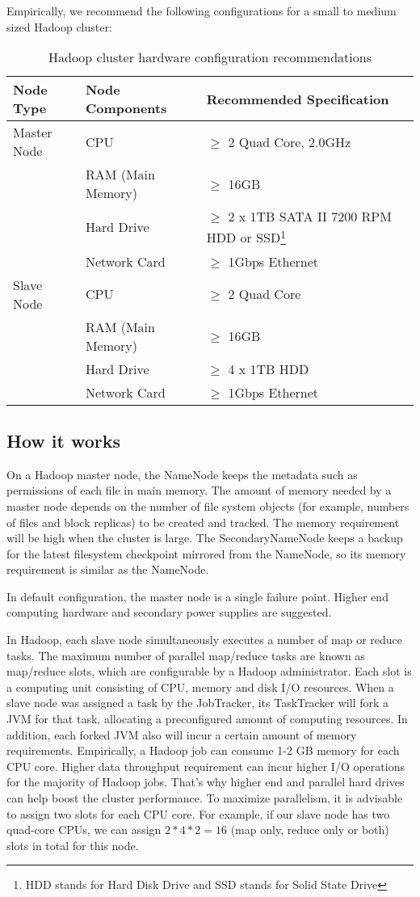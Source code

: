Empirically, we recommend the following configurations for a small to medium sized Hadoop cluster:

\begin{table}[h]
  \centering
  \begin{tabular}{lll}
    \toprule
    \textbf{Node Type} & \textbf{Node Components} & \textbf{Recommended Specification} \\ \midrule
    Master Node & CPU	& $\ge$ 2 Quad Core, 2.0GHz \\
    & RAM (Main Memory) & $\ge$ 16GB \\
    & Hard Drive & $\ge$ 2 x 1TB SATA II 7200 RPM HDD or SSD\footnote{HDD stands for Hard Disk Drive and SSD stands for Solid State Drive} \\
    & Network Card & $\ge$ 1Gbps Ethernet \\ \midrule
    Slave Node & CPU & $\ge$ 2 Quad Core \\
    & RAM (Main Memory) & $\ge$ 16GB \\
    & Hard Drive & $\ge$ 4 x 1TB HDD \\
    & Network Card & $\ge$ 1Gbps Ethernet \\ \bottomrule
  \end{tabular}
  \caption{Hadoop cluster hardware configuration recommendations}\label{tbl:cluster.hardware}
\end{table}
\subsection*{How it works}
On a Hadoop master node, the NameNode keeps the metadata such as permissions of each file in main memory. The amount of memory needed by a master node depends on the number of file system objects (for example, numbers of files and block replicas) to be created and tracked. The memory requirement will be high when the cluster is large. The SecondaryNameNode keeps a backup for the latest filesystem checkpoint mirrored from the NameNode, so its memory requirement is similar as the NameNode.

In default configuration, the master node is a single failure point. Higher end computing hardware and secondary power supplies are suggested.

In Hadoop, each slave node simultaneously executes a number of map or reduce tasks. The maximum number of parallel map/reduce tasks are known as map/reduce slots, which are configurable by a Hadoop administrator. Each slot is a computing unit consisting of CPU, memory and disk I/O resources. When a slave node was assigned a task by the JobTracker, its TaskTracker will fork a JVM for that task, allocating a preconfigured amount of computing resources. In addition, each forked JVM also will incur a certain amount of memory requirements. Empirically, a Hadoop job can consume 1-2 GB memory for each CPU core. Higher data throughput requirement can incur higher I/O operations for the majority of Hadoop jobs. That's why higher end and parallel hard drives can help boost the cluster performance. To maximize parallelism, it is advisable to assign two slots for each CPU core. For example, if our slave node has two quad-core CPUs, we can assign $2 * 4 * 2 = 16$ (map only, reduce only or both) slots in total for this node.

